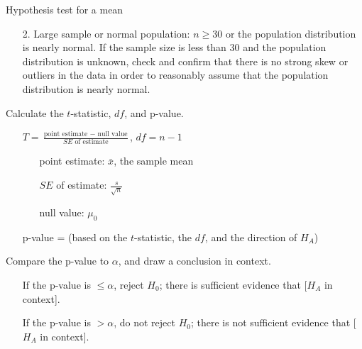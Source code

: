 \begin{onebox}{Hypothesis test for a mean}
{\begin{itemize}
without replacement, check that sample size is less than 10\% of the population size.
\item[2.] Large sample or normal population:  $n\ge 30$ or the population distribution is nearly normal. If the sample size is less than 30 and the population distribution is unknown, check and confirm that there is no strong skew or outliers in the data in order to reasonably assume that the population distribution is nearly normal.
\end{itemize}
}
  Calculate the $t$-statistic, $df$, and p-value.
\begin{itemize}
\item[] $T = \frac{\text{point estimate } - \text{ null value}}{SE \text{ of estimate}}$,  \quad $df=n-1$
\begin{itemize}
\item[] point estimate: $\bar{x}$, the sample mean
\item[] $SE$ of estimate:  $\frac{s}{\sqrt{n}}$
\item[] null value: $\mu_0$
\end{itemize}
\item[] p-value = (based on the $t$-statistic, the $df$, and the direction of $H_A$)
\end{itemize}
  Compare the p-value to $\alpha$, and draw a conclusion in context.\vspace{-1mm}
\begin{itemize}
\item[] If the p-value is $\le \alpha$, reject $H_0$; there is sufficient evidence that [$H_A$ in context]. 
\item[] If the p-value is $> \alpha$, do not reject $H_0$; there is not sufficient evidence that [$H_A$ in context].
\end{itemize}\end{onebox}


